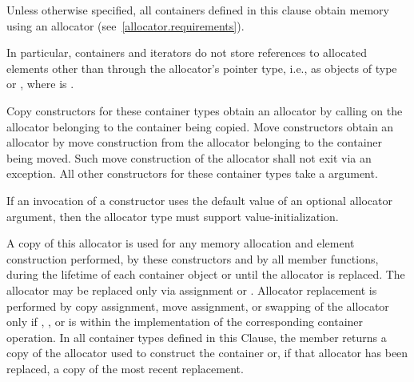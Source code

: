 \pnum
Unless otherwise specified, all containers defined in this clause obtain memory
using an allocator (see~\ref{allocator.requirements}).
\begin{note}
In particular, containers and iterators do not store references
to allocated elements other than through the allocator's pointer type,
i.e., as objects of type  or
,
where  is .
\end{note}
Copy constructors for these container types obtain an allocator by calling
on the allocator belonging to the container being copied.
Move constructors obtain an allocator by move construction from the allocator belonging to
the container being moved. Such move construction of the allocator shall not exit via an
exception.
All other constructors for these container types take a
 argument.
\begin{note}
If an invocation of a constructor uses the default value of an optional
allocator argument, then the allocator type must support value-initialization.
\end{note}
A copy of this allocator is used for any memory allocation and element construction
performed, by these constructors and by all member functions,
during the lifetime of each container object
or until the allocator is replaced. The allocator may be replaced only via assignment or
. Allocator replacement is performed by
copy assignment, move assignment, or swapping of the allocator only if
,
,
or  is 
within the implementation of the corresponding container operation.
In all container types defined in this Clause, the member 
returns a copy of the allocator used to construct the container or, if that allocator
has been replaced, a copy of the most recent replacement.

